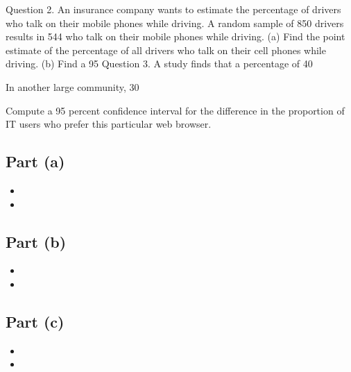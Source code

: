 \documentclass[a4paper,12pt]{article}
\begin{document}
Question 2. An insurance company wants to estimate the percentage of drivers who talk on their mobile phones while driving. 
A random sample of 850 drivers results in 544 who talk on their mobile phones while driving.
(a) Find the point estimate of the percentage of all drivers who talk on their cell phones while driving.
(b) Find a 95%
Question 3. 
A study finds that a percentage of 40%

In another large community, 30%

Compute a 95 percent confidence interval for the difference in the proportion of IT users who prefer this particular web browser.




\subsection*{Part (a)}

\begin{itemize}
\item
\item
\end{itemize}



\subsection*{Part (b)}

\begin{itemize}
\item
\item
\end{itemize}




\subsection*{Part (c)}

\begin{itemize}
\item
\item
\end{itemize}
\end{document}
